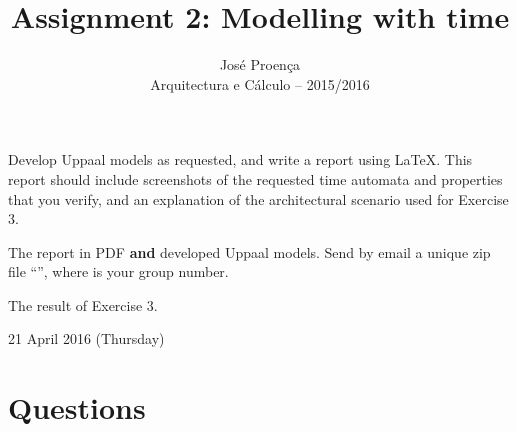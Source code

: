 \documentclass[11pt]{article}
\theoremstyle{myplain}
\theoremstyle{definition} %
\begin{document}
 
 
\title{Assignment 2: Modelling with time}
\author{Jos\'{e} Proen\c{c}a\\
Arquitectura e C\'alculo -- 2015/2016} 
 
\maketitle

 Develop Uppaal models as requested, and write a report using LaTeX. This report should include screenshots of the requested time automata and properties that you verify, and an explanation of the architectural scenario used for Exercise 3.

 The report in PDF \textbf{and} developed Uppaal models. Send by email a unique zip file ``'', where  is your group number.

 The result of Exercise 3.

 21 April 2016 (Thursday)
 
\section*{Questions}

%
%
%
%
%
\end{document}
